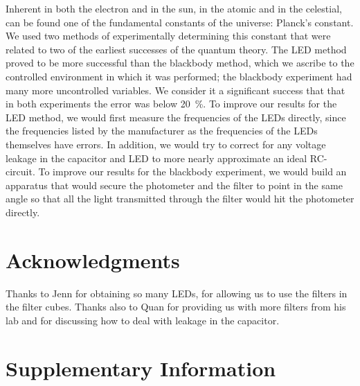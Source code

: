 \documentclass{lab}
\begin{document}
Inherent in both the electron and in the sun, in the atomic and in the
celestial, can be found one of the fundamental constants of the universe:
Planck's constant. We used two methods of experimentally determining this
constant that were related to two of the earliest successes of the quantum
theory. The LED method proved to be more successful than the blackbody method,
which we ascribe to the controlled environment in which it was performed; the
blackbody experiment had many more uncontrolled variables. We consider it a
significant success that that in both experiments the error was below
\SI{20}{\percent}. To improve our results for the LED method, we would first
measure the frequencies of the LEDs directly, since the frequencies listed by
the manufacturer as the frequencies of the LEDs themselves have errors. In
addition, we would try to correct for any voltage leakage in the capacitor and
LED to more nearly approximate an ideal RC-circuit. To improve our results for
the blackbody experiment, we would build an apparatus that would secure the
photometer and the filter to point in the same angle so that all the light
transmitted through the filter would hit the photometer directly.

\section{Acknowledgments}
\label{Sec:Acks}
Thanks to Jenn for obtaining so many LEDs, for allowing us to use the filters in
the filter cubes. Thanks also to Quan for providing us with more filters from
his lab and for discussing how to deal with leakage in the capacitor.


\nocite{*}
\printbibliography%
\label{Sec:Refs}

\section{Supplementary Information}
\label{Sec:SupInfo}













\end{document}
